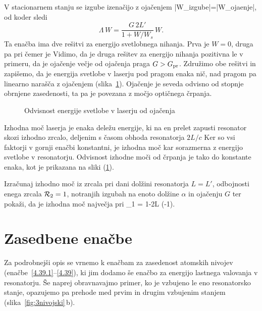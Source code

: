 V stacionarnem stanju se izgube izenačijo z ojačenjem
\beq
|\Delta W_{\rm izgube}|=|\Delta W_{\rm ojaenje}|,
\eeq
od koder sledi
\begin{equation}  
\Lambda\, W=\frac{G\,2L'}{1+W/W_s}\,W.
\label{5.3}
\end{equation}
Ta enačba ima dve rešitvi za energijo svetlobnega nihanja. 
Prva je $W=0$, druga pa  
pri čemer je 
Vidimo, da je druga rešitev za energijo nihanja pozitivna le v primeru,
da je ojačenje večje od ojačenja praga $G> G_{\rm pr}$. Združimo 
obe rešitvi in zapišemo, da je energija svetlobe v laserju pod pragom enaka
nič, nad pragom pa linearno narašča z ojačenjem (slika~\ref{fig:energija}).
Ojačenje je seveda odvisno od stopnje obrnjene zasedenosti, ta pa je povezana
z močjo optičnega črpanja.
\begin{figure}[h]
\centering
\def\svgwidth{80truemm} 

\caption{Odvisnost energije svetlobe v laserju od ojačenja}
\label{fig:energija}
\end{figure}

Izhodna moč laserja je enaka deležu energije, ki na en prelet zapusti
resonator skozi izhodno zrcalo, deljenim s časom obhoda resonatorja $2L/c$ 
Ker so vsi faktorji v gornji enačbi konstantni, je izhodna moč kar sorazmerna
z energijo svetlobe v resonatorju. Odvisnost izhodne moči od črpanja je 
tako do konstante enaka, kot je prikazana na sliki (\ref{fig:energija}). 

\begin{definition}
Izračunaj izhodno moč iz zrcala pri dani dolžini resonatorja $L=L'$, 
odbojnosti enega zrcala ${\cal {R}}_{2}=1$, 
notranjih izgubah na enoto dolžine $\alpha$ in ojačenju $G$ ter pokaži, da
je izhodna moč največja pri 
\beq
{}_1 = 1-2\alpha L \left(-1\right).
\eeq
\end{definition}

\section{Zasedbene enačbe}
Za podrobnejši opis se vrnemo k enačbam za zasedenost atomskih nivojev 
(enačbe~\ref{4.39.1}--\ref{4.39}), ki jim dodamo še enačbo za energijo 
lastnega valovanja v resonatorju. Še naprej obravnavajmo primer, ko je 
vzbujeno le eno resonatorsko stanje, opazujemo pa prehode med prvim 
in drugim vzbujenim stanjem (slika~\ref{fig:3nivojski}\,b). 

